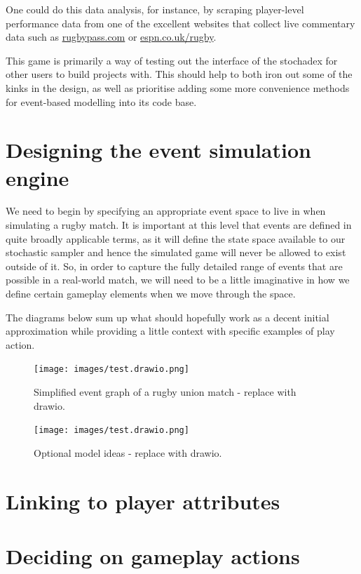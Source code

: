 \documentclass{book}
\begin{document}
One could do this data analysis, for instance, by scraping player-level performance data from one of the excellent websites that collect live commentary data such as \href{https://www.rugbypass.com/}{rugbypass.com} or \href{https://www.espn.co.uk/rugby/}{espn.co.uk/rugby}.

This game is primarily a way of testing out the interface of the stochadex for other users to build projects with. This should help to both iron out some of the kinks in the design, as well as prioritise adding some more convenience methods for event-based modelling into its code base.

\section{\sffamily Designing the event simulation engine}

We need to begin by specifying an appropriate event space to live in when simulating a rugby match. It is important at this level that events are defined in quite broadly applicable terms, as it will define the state space available to our stochastic sampler and hence the simulated game will never be allowed to exist outside of it. So, in order to capture the fully detailed range of events that are possible in a real-world match, we will need to be a little imaginative in how we define certain gameplay elements when we move through the space.

The diagrams below sum up what should hopefully work as a decent initial approximation while providing a little context with specific examples of play action.

\begin{figure}[h]
\texttt{[image: images/test.drawio.png]}
\caption{Simplified event graph of a rugby union match - replace with drawio.}
\label{fig:event-graph}
\end{figure}

\begin{figure}[h]
\texttt{[image: images/test.drawio.png]}
\caption{Optional model ideas - replace with drawio.}
\label{fig:model-ideas}
\end{figure}

\section{\sffamily Linking to player attributes}

\section{\sffamily Deciding on gameplay actions}
\end{document}
